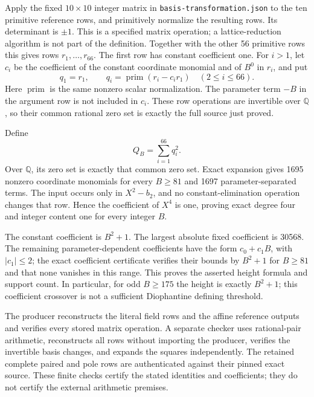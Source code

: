 \documentclass[11pt,a4paper]{article}
\newcommand{\Q}{\mathbb Q}\newcommand{\Z}{\mathbb Z}
\begin{document}
Apply the fixed $10\times10$ integer matrix in
\nolinkurl{basis-transformation.json} to the ten primitive reference
rows, and primitively normalize the resulting rows. Its determinant
is $\pm1$. This is a specified matrix operation; a lattice-reduction
algorithm is not part of the definition. Together with the other
56 primitive rows this gives rows $r_1,\ldots,r_{66}$. The first
row has constant coefficient one. For $i>1$, let $c_i$ be the
coefficient of the constant coordinate monomial and of $B^0$ in
$r_i$, and put
\[
 q_1=r_1,\qquad q_i=\operatorname{prim}(r_i-c_i r_1)
 \quad(2\le i\le66).
\]
Here $\operatorname{prim}$ is the same nonzero scalar normalization.
The parameter term $-B$ in the argument row is not included in $c_i$.
These row operations are invertible over $\Q$, so their common
rational zero set is exactly the full source just proved.

Define
\[
                         Q_B=\sum_{i=1}^{66}q_i^2.
\]
Over $\Q$, its zero set is exactly that common zero set. Exact
expansion gives 1695 nonzero coordinate monomials for every $B\ge81$
and 1697 parameter-separated terms. The input occurs only in
$X^2-b_2$, and no constant-elimination operation changes that row.
Hence the coefficient of $X^4$ is one, proving exact degree four
and integer content one for every integer $B$.

The constant coefficient is $B^2+1$. The largest absolute fixed
coefficient is 30568. The remaining parameter-dependent coefficients
have the form $c_0+c_1B$, with $|c_1|\le2$; the exact coefficient
certificate verifies their bounds by $B^2+1$ for $B\ge81$ and that
none vanishes in this range. This proves the asserted height formula
and support count. In particular, for odd $B\ge175$ the height is
exactly $B^2+1$; this coefficient crossover is not a sufficient
Diophantine defining threshold.

The producer reconstructs the literal field rows and the affine
reference outputs and verifies every stored matrix operation. A
separate checker uses rational-pair arithmetic, reconstructs all rows
without importing the producer, verifies the invertible basis changes,
and expands the squares independently. The retained complete paired
and pole rows are authenticated against their pinned exact source.
These finite checks certify the stated identities and coefficients;
they do not certify the external arithmetic premises.
\end{document}
